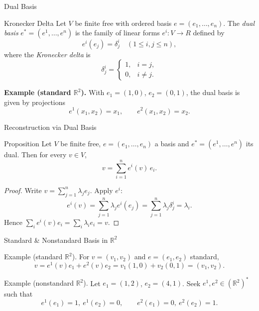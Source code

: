 \begin{frame}{Dual Basis}
\begin{block}{Kronecker Delta}
    Let $V$ be finite free with ordered basis $e=(e_1,\dots,e_n)$. The \emph{dual basis} $e^*=(e^1,\dots,e^n)$ is the family of linear forms $e^i:V\to R$ defined by
\[
e^i(e_j)=\delta^i_j\quad (1\le i,j\le n),
\]
where the \emph{Kronecker delta} is
\[
\delta^i_j=
\begin{cases}
1, & i=j,\\
0, & i\ne j.
\end{cases}
\]
\end{block}

\textbf{Example (standard $\mathbb{R}^2$).} With $e_1=(1,0)$, $e_2=(0,1)$, the dual basis is given by projections
\[
e^1(x_1,x_2)=x_1,\qquad e^2(x_1,x_2)=x_2.
\]
\end{frame}

\begin{frame}{Reconstruction via Dual Basis}
\vspace{-0.2cm}
\begin{block}{Proposition}
Let $V$ be finite free, $e=(e_1,\dots,e_n)$ a basis and $e^*=(e^1,\dots,e^n)$ its dual. Then for every $v\in V$,
\[
v=\sum_{i=1}^n e^i(v)\, e_i.
\]
\end{block}
\vspace{-0.2cm}
\begin{proof}
Write $v=\sum_{j=1}^n \lambda_j e_j$. Apply $e^i$:
\[
e^i(v)=\sum_{j=1}^n \lambda_j e^i(e_j)=\sum_{j=1}^n \lambda_j \delta^i_j=\lambda_i.
\]
Hence $\sum_i e^i(v)e_i=\sum_i \lambda_i e_i=v$.
\end{proof}

\end{frame}

\begin{frame}{Standard \& Nonstandard Basis in $\mathbb{R}^2$}
\begin{block}{Example (standard $\mathbb{R}^2$).} For $v=(v_1,v_2)$ and $e=(e_1,e_2)$ standard,
\[
v=e^1(v)e_1+e^2(v)e_2 = v_1(1,0)+v_2(0,1)=(v_1,v_2).
\]
\end{block}
\begin{block}{Example (nonstandard $\mathbb{R}^2$).}
    Let $e_1=(1,2)$, $e_2=(4,1)$. Seek $e^1,e^2\in (\mathbb{R}^2)^*$ such that
\[
e^1(e_1)=1,\ e^1(e_2)=0,\qquad e^2(e_1)=0,\ e^2(e_2)=1.
\]
\end{block}
\end{frame}

